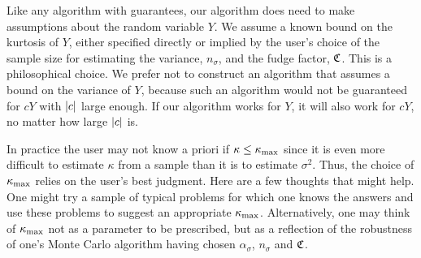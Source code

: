 \documentclass{iitthesis}
\theoremstyle{definition}
\begin{document}
Like any algorithm with guarantees, our algorithm does need to make assumptions about the random variable $Y$.  We assume a known bound on the kurtosis of $Y$, either specified directly or implied by the user's choice of the sample size for estimating the variance, $n_\sigma$, and the fudge factor, $\mathfrak{C}$.  This is a philosophical choice.  We prefer not to construct an algorithm that assumes a bound on the variance of $Y$, because such an algorithm would not be guaranteed for $cY$ with $\left \lvert c \right \rvert$ large enough.  If our algorithm works for $Y$, it will also work for $cY$, no matter how large $\left \lvert c \right \rvert$ is. 

In practice the user may not know a priori if $\kappa \le \kappa_{\max}$ since it is even more difficult to estimate $\kappa$ from a sample than it is to estimate $\sigma^2$. Thus, the choice of $\kappa_{\max}$ relies on the user's best judgment.  Here are a few thoughts that might help.  One might try a sample of typical problems for which one knows the answers and use these problems to suggest an appropriate $\kappa_{\max}$.  Alternatively, one may think of $\kappa_{\max}$ not as a parameter to be prescribed, but as a reflection of the robustness of one's Monte Carlo algorithm having chosen $\alpha_\sigma$, $n_\sigma$ and $\mathfrak{C}$. 

%
%
\end{document}
